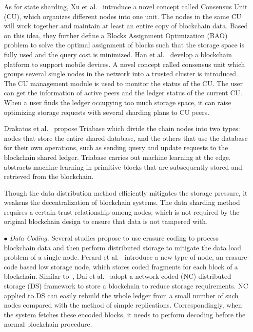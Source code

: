 \documentclass[acmsmall]{acmart}
\begin{document}
As for state sharding, Xu et al.~\cite{xu2018cub} introduce a novel concept called Consensus Unit (CU), which organizes different nodes into one unit. The nodes in the same CU will work together and maintain at least an entire copy of blockchain data. Based on this idea, they further define a Blocks Assignment Optimization (BAO) problem to solve the optimal assignment of blocks such that the storage space is fully used and the query cost is minimized.
Han et al.~\cite{DBLP:conf/icde/HanXC18} develop a blockchain platform to support mobile devices. A novel concept called consensus unit which groups several single nodes in the network into a trusted cluster is introduced. The CU management module is used to monitor the status of the CU. The user can get the information of active peers and the ledger status of the current CU. When a user finds the ledger occupying too much storage space, it can raise optimizing storage requests with several sharding plans to CU peers.


Drakatos et al.~\cite{DBLP:conf/icde/DrakatosDKKZ21} propose Triabase which divide the chain nodes into two types: nodes that store the entire shared database, and the others that use the database for their own operations, such as sending query and update requests to the blockchain shared ledger. Triabase carries out machine learning at the edge, abstracts machine learning in primitive blocks that are subsequently stored and retrieved from the blockchain.


Though the data distribution method efficiently mitigates the storage pressure, it weakens the decentralization of blockchain systems. The data sharding method requires a certain trust relationship among nodes, which is not required by the original blockchain design to ensure that data is not tampered with.
 



$\bullet$ {\it Data Coding.} 
Several studies propose to use erasure coding to process blockchain data and then perform distributed storage to mitigate the data load problem of a single node.
Perard et al.~\cite{perard2018erasure} introduce a new type of node, an erasure-code based low storage node, which stores coded fragments for each block of a blockchain. Similar to~\cite{perard2018erasure}, Dai et al.~\cite{dai2018low} adopt a network coded (NC) distributed storage (DS) framework to store a blockchain to reduce storage requirements. NC applied to DS can easily rebuild the whole ledger from a small number of such nodes compared with the method of simple replications. Correspondingly, when the system fetches these encoded blocks, it needs to perform decoding before the normal blockchain procedure. 
\end{document}
